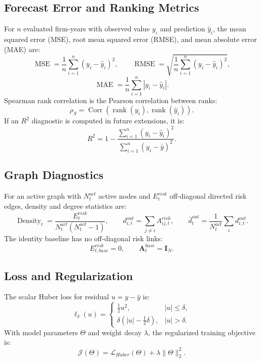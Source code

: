 \documentclass[11pt, a4paper]{article}
\begin{document}
\subsection{Forecast Error and Ranking Metrics}
For $n$ evaluated firm-years with observed value $y_i$ and prediction $\hat{y}_i$, the mean squared error (MSE), root mean squared error (RMSE), and mean absolute error (MAE) are:
\begin{equation}
\operatorname{MSE}=\frac{1}{n}\sum_{i=1}^{n}(y_i-\hat{y}_i)^2,\qquad
\operatorname{RMSE}=\sqrt{\frac{1}{n}\sum_{i=1}^{n}(y_i-\hat{y}_i)^2},
\end{equation}
\begin{equation}
\operatorname{MAE}=\frac{1}{n}\sum_{i=1}^{n}|y_i-\hat{y}_i|.
\end{equation}
Spearman rank correlation is the Pearson correlation between ranks:
\begin{equation}
\rho_S=\operatorname{Corr}\left(\operatorname{rank}(y_i),\operatorname{rank}(\hat{y}_i)\right).
\end{equation}
If an $R^2$ diagnostic is computed in future extensions, it is:
\begin{equation}
R^2=1-\frac{\sum_{i=1}^{n}(y_i-\hat{y}_i)^2}{\sum_{i=1}^{n}(y_i-\bar{y})^2}.
\end{equation}

\subsection{Graph Diagnostics}
For an active graph with $N_t^{act}$ active nodes and $E_t^{risk}$ off-diagonal directed risk edges, density and degree statistics are:
\begin{equation}
\operatorname{Density}_t=\frac{E_t^{risk}}{N_t^{act}(N_t^{act}-1)},\qquad
d^{out}_{i,t}=\sum_{j\neq i}A^{risk}_{ij,t},\qquad
\bar{d}^{out}_{t}=\frac{1}{N_t^{act}}\sum_i d^{out}_{i,t}.
\end{equation}
The identity baseline has no off-diagonal risk links:
\begin{equation}
E_{t,base}^{risk}=0,\qquad \mathbf{A}^{base}_{t}=\mathbf{I}_N.
\end{equation}

\subsection{Loss and Regularization}
The scalar Huber loss for residual $u=y-\hat{y}$ is:
\begin{equation}
\ell_{\delta}(u)=
\begin{cases}
\frac{1}{2}u^2, & |u|\leq \delta,\\
\delta\left(|u|-\frac{1}{2}\delta\right), & |u|>\delta.
\end{cases}
\end{equation}
With model parameters $\Theta$ and weight decay $\lambda$, the regularized training objective is:
\begin{equation}
\mathcal{J}(\Theta)=\mathcal{L}_{Huber}(\Theta)+\lambda\|\Theta\|_2^2.
\end{equation}
\end{document}
